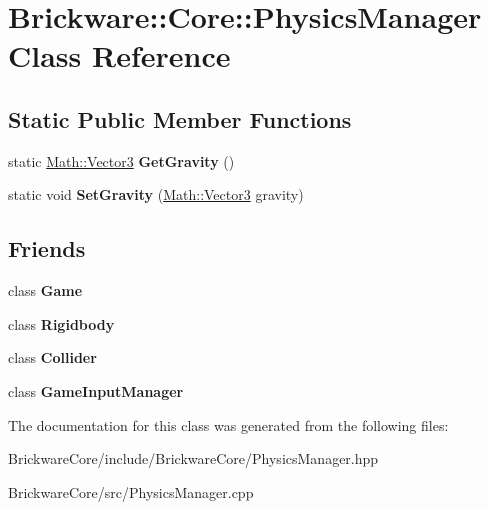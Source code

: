 \hypertarget{classBrickware_1_1Core_1_1PhysicsManager}{}\section{Brickware\+:\+:Core\+:\+:Physics\+Manager Class Reference}
\label{classBrickware_1_1Core_1_1PhysicsManager}
\subsection*{Static Public Member Functions}
\begin{DoxyCompactItemize}
\item 
\hypertarget{classBrickware_1_1Core_1_1PhysicsManager_afbde235856ae12d8666fba29f94723d2}{}static \hyperlink{classBrickware_1_1Math_1_1Vector3}{Math\+::\+Vector3} {\bfseries Get\+Gravity} ()\label{classBrickware_1_1Core_1_1PhysicsManager_afbde235856ae12d8666fba29f94723d2}

\item 
\hypertarget{classBrickware_1_1Core_1_1PhysicsManager_ac68a4206ad24076df97236bebb700f10}{}static void {\bfseries Set\+Gravity} (\hyperlink{classBrickware_1_1Math_1_1Vector3}{Math\+::\+Vector3} gravity)\label{classBrickware_1_1Core_1_1PhysicsManager_ac68a4206ad24076df97236bebb700f10}

\end{DoxyCompactItemize}
\subsection*{Friends}
\begin{DoxyCompactItemize}
\item 
\hypertarget{classBrickware_1_1Core_1_1PhysicsManager_aa2fab026580d6f14280c2ffb8063a314}{}class {\bfseries Game}\label{classBrickware_1_1Core_1_1PhysicsManager_aa2fab026580d6f14280c2ffb8063a314}

\item 
\hypertarget{classBrickware_1_1Core_1_1PhysicsManager_ab9677fbc0a8849136cf78204d65c4935}{}class {\bfseries Rigidbody}\label{classBrickware_1_1Core_1_1PhysicsManager_ab9677fbc0a8849136cf78204d65c4935}

\item 
\hypertarget{classBrickware_1_1Core_1_1PhysicsManager_a95f9c6cfd56f684a85ac83dd3f5a4e51}{}class {\bfseries Collider}\label{classBrickware_1_1Core_1_1PhysicsManager_a95f9c6cfd56f684a85ac83dd3f5a4e51}

\item 
\hypertarget{classBrickware_1_1Core_1_1PhysicsManager_ac47e2f0a982deffcf8368ec6cd1acce9}{}class {\bfseries Game\+Input\+Manager}\label{classBrickware_1_1Core_1_1PhysicsManager_ac47e2f0a982deffcf8368ec6cd1acce9}

\end{DoxyCompactItemize}


The documentation for this class was generated from the following files\+:\begin{DoxyCompactItemize}
\item 
Brickware\+Core/include/\+Brickware\+Core/Physics\+Manager.\+hpp\item 
Brickware\+Core/src/Physics\+Manager.\+cpp\end{DoxyCompactItemize}
